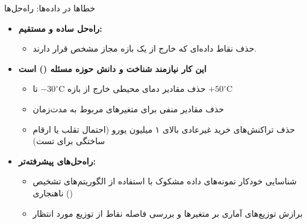 \begin{frame}{خطاها در داده‌ها: راه‌حل‌ها}
\begin{itemize}
  \item \textbf{راه‌حل ساده و مستقیم:}
  \begin{itemize}
    \item حذف نقاط داده‌ای که خارج از یک بازه مجاز مشخص قرار دارند.
  \end{itemize}
  \vspace{0.2cm}
  \item \textbf{این کار نیازمند شناخت و دانش حوزه مسئله () است}
  \begin{itemize}
    \item حذف مقادیر دمای محیطی خارج از بازه $-30^\circ\text{C}$ تا $+50^\circ\text{C}$
    \item حذف مقادیر منفی برای متغیرهای مربوط به مدت‌زمان
    \item حذف تراکنش‌های خرید غیرعادی بالای ۱ میلیون یورو (احتمال تقلب یا ارقام ساختگی برای تست)
  \end{itemize}
  \vspace{0.2cm}
  \item \textbf{راه‌حل‌های پیشرفته‌تر:}
  \begin{itemize}
    \item شناسایی خودکار نمونه‌های داده مشکوک با استفاده از الگوریتم‌های تشخیص ناهنجاری ()
    \item برازش توزیع‌های آماری بر متغیرها و بررسی فاصله نقاط از توزیع مورد انتظار
  \end{itemize}
\end{itemize}
\end{frame}
